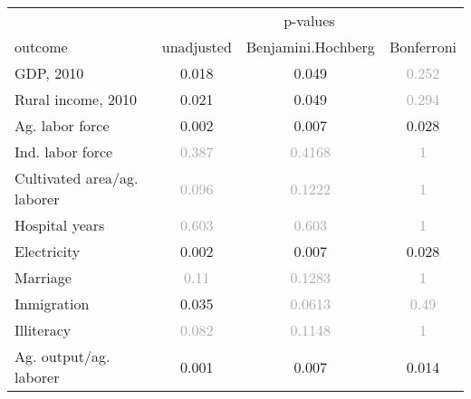 \documentclass[border=1mm, preview]{standalone}
\begin{document}
\begin{table}[H]
\centering
\begin{tabular}{llll}
\toprule
\multicolumn{1}{c}{ } & \multicolumn{3}{c}{p-values} \\
\cmidrule(l{3pt}r{3pt}){2-4}
outcome & unadjusted & Benjamini.Hochberg & Bonferroni\\
\midrule
GDP, 2010 & \multicolumn{1}{c}{\textcolor[HTML]{181a19}{0.018}} & \multicolumn{1}{c}{\textcolor[HTML]{181a19}{0.049}} & \multicolumn{1}{c}{\textcolor[HTML]{a6aba8}{0.252}}\\
Rural income, 2010 & \multicolumn{1}{c}{\textcolor[HTML]{181a19}{0.021}} & \multicolumn{1}{c}{\textcolor[HTML]{181a19}{0.049}} & \multicolumn{1}{c}{\textcolor[HTML]{a6aba8}{0.294}}\\
Ag. labor force & \multicolumn{1}{c}{\textcolor[HTML]{181a19}{0.002}} & \multicolumn{1}{c}{\textcolor[HTML]{181a19}{0.007}} & \multicolumn{1}{c}{\textcolor[HTML]{181a19}{0.028}}\\
Ind. labor force & \multicolumn{1}{c}{\textcolor[HTML]{a6aba8}{0.387}} & \multicolumn{1}{c}{\textcolor[HTML]{a6aba8}{0.4168}} & \multicolumn{1}{c}{\textcolor[HTML]{a6aba8}{1}}\\
Cultivated area/ag. laborer & \multicolumn{1}{c}{\textcolor[HTML]{a6aba8}{0.096}} & \multicolumn{1}{c}{\textcolor[HTML]{a6aba8}{0.1222}} & \multicolumn{1}{c}{\textcolor[HTML]{a6aba8}{1}}\\
\addlinespace
Hospital years & \multicolumn{1}{c}{\textcolor[HTML]{a6aba8}{0.603}} & \multicolumn{1}{c}{\textcolor[HTML]{a6aba8}{0.603}} & \multicolumn{1}{c}{\textcolor[HTML]{a6aba8}{1}}\\
Electricity & \multicolumn{1}{c}{\textcolor[HTML]{181a19}{0.002}} & \multicolumn{1}{c}{\textcolor[HTML]{181a19}{0.007}} & \multicolumn{1}{c}{\textcolor[HTML]{181a19}{0.028}}\\
Marriage & \multicolumn{1}{c}{\textcolor[HTML]{a6aba8}{0.11}} & \multicolumn{1}{c}{\textcolor[HTML]{a6aba8}{0.1283}} & \multicolumn{1}{c}{\textcolor[HTML]{a6aba8}{1}}\\
Inmigration & \multicolumn{1}{c}{\textcolor[HTML]{181a19}{0.035}} & \multicolumn{1}{c}{\textcolor[HTML]{a6aba8}{0.0613}} & \multicolumn{1}{c}{\textcolor[HTML]{a6aba8}{0.49}}\\
Illiteracy & \multicolumn{1}{c}{\textcolor[HTML]{a6aba8}{0.082}} & \multicolumn{1}{c}{\textcolor[HTML]{a6aba8}{0.1148}} & \multicolumn{1}{c}{\textcolor[HTML]{a6aba8}{1}}\\
\addlinespace
Ag. output/ag. laborer & \multicolumn{1}{c}{\textcolor[HTML]{181a19}{0.001}} & \multicolumn{1}{c}{\textcolor[HTML]{181a19}{0.007}} & \multicolumn{1}{c}{\textcolor[HTML]{181a19}{0.014}}\\

\end{tabular}
\end{table}
\end{document}
